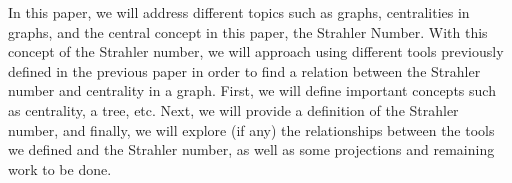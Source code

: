 In this paper, we will address different topics such as graphs, centralities in graphs, and the central concept in this paper, the Strahler Number. With this concept of the Strahler number, we will approach using different tools previously defined in the previous paper in order to find a relation between the Strahler number and centrality in a graph. First, we will define important concepts such as centrality, a tree, etc. Next, we will provide a definition of the Strahler number, and finally, we will explore (if any) the relationships between the tools we defined and the Strahler number, as well as some projections and remaining work to be done.
